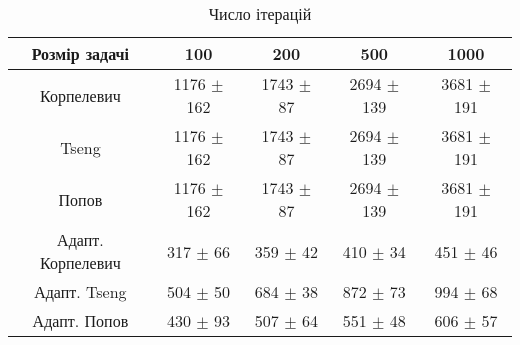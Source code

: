 \begin{table}[H]
	\centering
	\begin{tabular}{|c||c|c|c|c|}\hline
		Розмір задачі & 100 & 200 & 500 & 1000 \\ \hline \hline
		Корпелевич & 1176 $\pm$ 162 & 1743 $\pm$ 87 & 2694 $\pm$ 139 & 3681 $\pm$ 191 \\ \hline
		Tseng & 1176 $\pm$ 162 & 1743 $\pm$ 87 & 2694 $\pm$ 139 & 3681 $\pm$ 191 \\ \hline
		Попов & 1176 $\pm$ 162 & 1743 $\pm$ 87 & 2694 $\pm$ 139 & 3681 $\pm$ 191 \\ \hline \hline
		Адапт. Корпелевич & 317 $\pm$ 66 & 359 $\pm$ 42 & 410 $\pm$ 34 & 451 $\pm$ 46 \\ \hline
		Адапт. Tseng & 504 $\pm$ 50 & 684 $\pm$ 38 & 872 $\pm$ 73 & 994 $\pm$ 68 \\ \hline
		Адапт. Попов & 430 $\pm$ 93 & 507 $\pm$ 64 & 551 $\pm$ 48 & 606 $\pm$ 57 \\ \hline
	\end{tabular}
	\caption{Число ітерацій}
\end{table}
